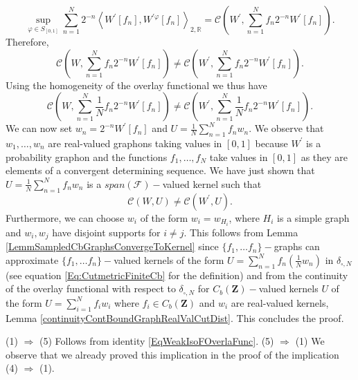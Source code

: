 \documentclass[11pt]{article}
\def\R{\mathbb{R}}
\def\N{\mathbb{N}}
\newcommand{\cF}{{\mathcal F}}  %
\newcommand{\Space}{\mathbf{Z}}
\newcommand{\CbFunct}{C_b(\Space)}
\newcommand{\UGraphon}{\widetilde{\mathcal{W}}_1}
\newcommand{\NcutR}[1]{\Vert#1\Vert_{\square,\R}}
\begin{document}
$$
 \sup _{\varphi \in S_{[0,1]}}\sum^{N}_{n=1}2^{-n}\left\langle W^{\prime}[f_n], W^{\prime \varphi}[f_n]\right\rangle_{2,\R}%
 =\mathcal{C}(W^{\prime},\sum^{N}_{n=1} f_n 2^{-n}W^{\prime}[f_n]).
$$
Therefore, 
$$
\mathcal{C}(W,\sum^{N}_{n=1} f_n 2^{-n}W^{\prime}[f_n])\neq \mathcal{C}(W^{\prime},\sum^{N}_{n=1} f_n 2^{-n}W^{\prime}[f_n]). 
$$
Using the homogeneity of the overlay functional we thus have
$$
\mathcal{C}(W,\sum^{N}_{n=1} \frac{1}{N}f_n 2^{-n}W^{\prime}[f_n])\neq \mathcal{C}(W^{\prime},\sum^{N}_{n=1} \frac{1}{N}f_n 2^{-n}W^{\prime}[f_n]). 
$$
We can now set $w_n=2^{-n}W^{\prime}[f_n]$ and $U=\frac{1}{N}\sum^N_{n=1}f_nw_n.$ We observe that $w_1,\ldots,w_n$ are real-valued graphons taking values in $[0,1]$ because $W^{\prime}$ is a probability graphon and the functions $f_1,\ldots,f_N$ take values in $[0,1]$ as they are elements of a convergent determining sequence. We have just shown that $U=\frac{1}{N}\sum^N_{n=1}f_nw_n$ is a $span(\cF)-$valued kernel such that $$
\mathcal{C}(W,U)\neq \mathcal{C}(W^{\prime},U). 
$$
Furthermore, we can choose $w_i$ of the form $w_i=w_{H_i}$, where $H_i$ is a simple graph and $w_i,w_j$ have disjoint supports for $i\neq j$. This follows from Lemma \ref{LemmSampledCbGraphsConvergeToKernel} since $\{f_1,\ldots f_n\}-$graphs can approximate $\{f_1,\ldots f_n\}-$valued kernels of the form $U=\sum^N_{n=1}f_n(\frac{1}{N}w_n)$ in $\delta_{\square,N}$ (see equation \eqref{Eq:CutmetricFiniteCb} for the definition) and from the continuity of the overlay functional with respect to $\delta_{\square,N}$ for $\CbFunct-$valued kernels $U$ of the form $U=\sum^N_{i=1}f_iw_i$ where $f_i\in\CbFunct$ and $w_i$ are real-valued kernels, Lemma \ref{continuityContBoundGraphRealValCutDist}.\newline
This concludes the proof.

(1) $\Rightarrow$ (5) Follows from identity \eqref{EqWeakIsoFOverlaFunc}. \newline
(5) $\Rightarrow$ (1) We observe that we already proved this implication in the proof of the implication (4) $\Rightarrow$ (1).
\endproof
\end{document}
